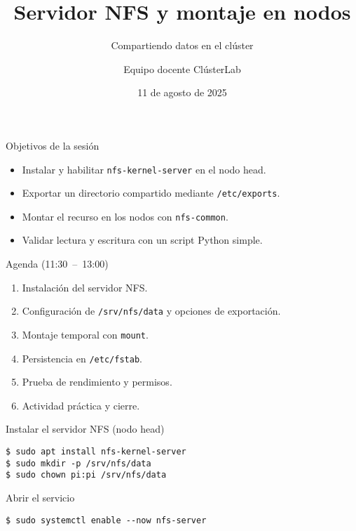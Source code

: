 \documentclass[aspectratio=169,professionalfonts]{beamer}
\title[ClústerLab • Día 4]{Servidor NFS y montaje en nodos}
\subtitle{Compartiendo datos en el clúster}
\author{Equipo docente ClústerLab}
\date{11 de agosto de 2025}
\begin{document}
\begin{frame}[plain]
  \titlepage
\end{frame}

\begin{frame}[fragile]{Objetivos de la sesión}
  \begin{itemize}
    \item Instalar y habilitar \texttt{nfs-kernel-server} en el nodo head.
    \item Exportar un directorio compartido mediante \texttt{/etc/exports}.
    \item Montar el recurso en los nodos con \texttt{nfs-common}.
    \item Validar lectura y escritura con un script Python simple.
  \end{itemize}
\end{frame}

\begin{frame}[fragile]{Agenda (11:30 – 13:00)}
  \begin{enumerate}
    \item Instalación del servidor NFS.
    \item Configuración de \texttt{/srv/nfs/data} y opciones de exportación.
    \item Montaje temporal con \texttt{mount}.
    \item Persistencia en \texttt{/etc/fstab}.
    \item Prueba de rendimiento y permisos.
    \item Actividad práctica y cierre.
  \end{enumerate}
\end{frame}

\begin{frame}[fragile]{Instalar el servidor NFS (nodo head)}
  \begin{verbatim}
$ sudo apt install nfs-kernel-server
$ sudo mkdir -p /srv/nfs/data
$ sudo chown pi:pi /srv/nfs/data
  \end{verbatim}
  \begin{block}{Abrir el servicio}
    \begin{verbatim}
$ sudo systemctl enable --now nfs-server
    \end{verbatim}
  \end{block}
\end{frame}
\end{document}
